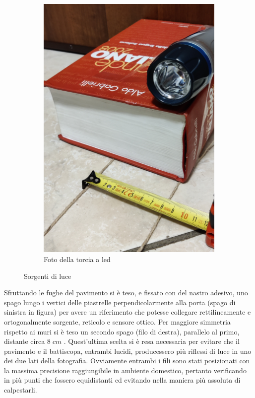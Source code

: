 \documentclass{article}
\begin{document}
\begin{figure}[h!]
\begin{subfigure}[b]{0.32\linewidth}
        \includegraphics[width=\linewidth]{Torcia.jpg}
        \caption{Foto della torcia a led}
    \end{subfigure}
    \caption{Sorgenti di luce}
\end{figure}

Sfruttando le fughe del pavimento si è teso, e fissato con del nastro adesivo, uno spago lungo i vertici delle piastrelle perpendicolarmente alla porta (spago di sinistra in figura) per avere un riferimento che potesse collegare rettilineamente e ortogonalmente sorgente, reticolo e sensore ottico. Per maggiore simmetria rispetto ai muri si è teso un secondo spago (filo di destra), parallelo al primo, distante circa $8 \; cm$ . Quest'ultima scelta si è resa necessaria per evitare che il pavimento e il battiscopa, entrambi lucidi, producessero più riflessi di luce in uno dei due lati della fotografia. Ovviamente entrambi i fili sono stati posizionati con la massima precisione raggiungibile in ambiente domestico, pertanto verificando in più punti che fossero equidistanti ed evitando nella maniera più assoluta di calpestarli.
\end{document}
